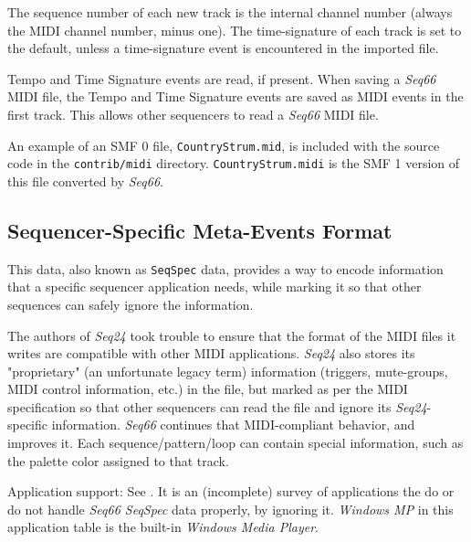    The sequence number of each new track is the internal channel number
   (always the MIDI channel number, minus one).
   The time-signature of each track is set to the default, unless a
   time-signature event is encountered in the imported file.

   Tempo and Time Signature events are read, if present.
   When saving a \textsl{Seq66} MIDI file,
   the Tempo and Time Signature events are saved as MIDI events in
   the first track.
   This allows other sequencers to read a \textsl{Seq66} MIDI file.

   An example of an SMF 0 file, \texttt{CountryStrum.mid}, is included with
   the source code in the \texttt{contrib/midi} directory.
   \texttt{CountryStrum.midi} is the SMF 1 version of this file converted by
   \textsl{Seq66}.

\subsection{Sequencer-Specific Meta-Events Format}
\label{subsec:midi_format_meta_format}

   This data, also known as
   \texttt{SeqSpec} data, provides a way to encode information
   that a specific sequencer application needs, while marking it so that other
   sequences can safely ignore the information.

   The authors of \textsl{Seq24} took trouble to ensure that the format
   of the MIDI files it writes are compatible with other MIDI applications.
   \textsl{Seq24} also stores its "proprietary" (an unfortunate legacy term)
   information (triggers, mute-groups, MIDI control
   information, etc.) in the file, but marked as per the MIDI specification
   so that other sequencers can read
   the file and ignore its \textsl{Seq24}-specific information.
   \textsl{Seq66} continues that MIDI-compliant behavior, and improves it.
   Each sequence/pattern/loop can contain special information, such as the
   palette color assigned to that track.

   Application support: See .
   It is an (incomplete) survey of applications
   the do or do not handle \textsl{Seq66 SeqSpec} data properly,
   by ignoring it.
   \textsl{Windows MP} in this application table is the
   built-in \textsl{Windows Media Player}.

